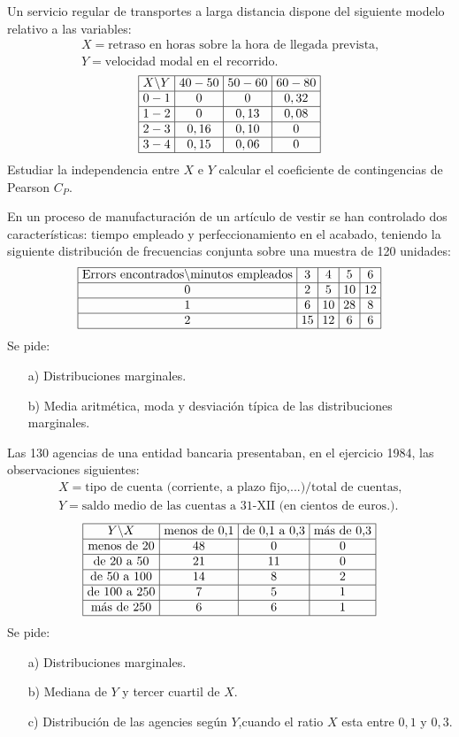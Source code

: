 \documentclass[12pt]{article}
\begin{document}
\begin{prob}
{Un servicio regular de transportes a larga distancia dispone  del
siguiente modelo relativo a las variables:
$$
\begin{array}{l}
X=\mbox{retraso en horas sobre la hora de llegada prevista,}\\ Y=\mbox{velocidad modal en
el recorrido.}
\end{array}
$$
$$\vbox{\halign{\offinterlineskip\strut\vrule\ $#$ &\vrule
\ $#$ &\vrule\ $#$ &\vrule\  $#$
\vrule\cr\noalign{\hrule}X\backslash Y & 40-50 & 50-60 &
60-80\cr\noalign{\hrule}0-1&0&0&0,32\cr\noalign{\hrule}
1-2&0&0,13&0,08\cr\noalign{\hrule}2-3&0,16&0,10&0\cr\noalign{\hrule}
3-4&0,15&0,06&0\cr\noalign{\hrule}}}$$ Estudiar la independencia
entre $X$ e $Y$ calcular el coeficiente de contingencias de
Pearson $C_P$.}
\end{prob}

\begin{prob}
{En un proceso de manufacturación de un artículo de vestir se han controlado dos
características: tiempo empleado y perfeccionamiento en el acabado, teniendo la siguiente
distribución de frecuencias conjunta sobre una muestra de 120 unidades:
$$\vbox{\halign{\offinterlineskip\strut\vrule\ $#$ &\vrule
\ $#$ &\vrule\ $#$ &\vrule\ $#$ &\vrule\  $#$ \vrule \cr\noalign{\hrule}\hbox{Errors
encontrados}\backslash\hbox{minutos
empleados}&3&4&5&6\cr\noalign{\hrule}0&2&5&10&12\cr\noalign{\hrule}
1&6&10&28&8\cr\noalign{\hrule}2&15&12&6&6\cr\noalign{\hrule}}}$$ Se pide:
\begin{itemize}
\item[a)] {Distribuciones marginales.}
\item[b)] {Media aritmética, moda y desviación típica de las distribuciones
marginales.}
\end{itemize}
}
\end{prob}


\begin{prob}
{Las 130 agencias de una entidad bancaria presentaban, en el
ejercicio 1984, las observaciones siguientes:
$$
\begin{array}{l}
X=\mbox{tipo de cuenta (corriente, a plazo fijo,...)/total de cuentas,}\\ Y=\mbox{saldo
medio de las cuentas a 31-XII (en cientos de euros.).}
\end{array}
$$
$$\vbox{\halign{\offinterlineskip\strut\vrule\ $#$ &\vrule
\ $#$ &\vrule\ $#$ &\vrule\  $#$
\vrule\cr\noalign{\hrule}Y\backslash X & \hbox{menos de
0,1}&\hbox{de 0,1 a 0,3}& \hbox{más de
0,3}\cr\noalign{\hrule}\hbox{menos de
20}&48&0&0\cr\noalign{\hrule}\hbox{de 20 a
50}&21&11&0\cr\noalign{\hrule}\hbox{de 50 a
100}&14&8&2\cr\noalign{\hrule}\hbox{de 100 a
250}&7&5&1\cr\noalign{\hrule}\hbox{más de
250}&6&6&1\cr\noalign{\hrule}}}$$
 Se pide:
\begin{itemize}
\item[a)] {Distribuciones marginales.}
\item[b)] {Mediana de $Y$ y tercer cuartil de $X$.}
\item[c)] {Distribución de las agencies según $Y$,cuando el ratio
$X$ esta entre $0,1$ y $0,3$.}
\end{itemize}
}
\end{prob}
\end{document}

